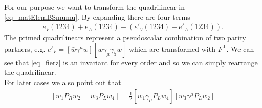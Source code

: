 \noindent For our purpose we want to transform the quadrilinear in \eqref{eq_matElemBSmumu}. By expanding there are four terms
\begin{align}
 e_V(1234)+e_A(1234)-\left(e'_V(1234) + e'_A(1234)\right).
 \label{eq_fierz}
\end{align}
The primed quadrilinears represent a pseudoscalar combination of two parity partners, e.g. $e'_V = \left[\bar w\gamma^\mu w\right]\left[w\gamma_\mu\gamma_5w\right]$
which are transformed with $F^\text{T}$. We can see that \eqref{eq_fierz} is an invariant for every order and so we can simply rearrange the quadrilinear.
\\ \noindent For later cases we also point out that 
\begin{align}
 \left[\bar w_1 P_R w_2\right]\left[\bar w_3 P_L w_4\right] = \frac12  \left[\bar w_1 \gamma_\mu P_L w_4\right]\left[\bar w_3 \gamma^\mu P_L w_2\right]
\end{align}

